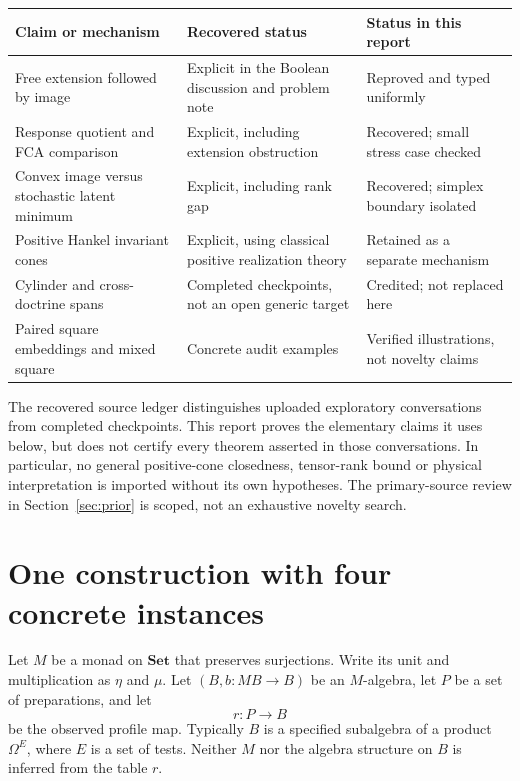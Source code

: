 \documentclass[11pt]{article}
\newcommand{\Set}{\mathbf{Set}}
\begin{document}
\begin{center}
\small
\begin{tabularx}{\textwidth}{@{}p{}Xp{}@{}}
\toprule
Claim or mechanism & Recovered status & Status in this report\\
\midrule
Free extension followed by image & Explicit in the Boolean discussion and problem note & Reproved and typed uniformly\\
Response quotient and FCA comparison & Explicit, including extension obstruction & Recovered; small stress case checked\\
Convex image versus stochastic latent minimum & Explicit, including rank gap & Recovered; simplex boundary isolated\\
Positive Hankel invariant cones & Explicit, using classical positive realization theory & Retained as a separate mechanism\\
Cylinder and cross-doctrine spans & Completed checkpoints, not an open generic target & Credited; not replaced here\\
Paired square embeddings and mixed square & Concrete audit examples & Verified illustrations, not novelty claims\\
\bottomrule
\end{tabularx}
\end{center}

The recovered source ledger distinguishes uploaded exploratory conversations from completed checkpoints. This report proves the elementary claims it uses below, but does not certify every theorem asserted in those conversations. In particular, no general positive-cone closedness, tensor-rank bound or physical interpretation is imported without its own hypotheses. The primary-source review in Section~\ref{sec:prior} is scoped, not an exhaustive novelty search.

\section{One construction with four concrete instances}
\label{sec:construction}

Let $M$ be a monad on $\Set$ that preserves surjections. Write its unit and multiplication as $\eta$ and $\mu$. Let $(B,b:MB\to B)$ be an $M$-algebra, let $P$ be a set of preparations, and let
\[
 r:P\longrightarrow B
\]
be the observed profile map. Typically $B$ is a specified subalgebra of a product $\Omega^E$, where $E$ is a set of tests. Neither $M$ nor the algebra structure on $B$ is inferred from the table $r$.
\end{document}

